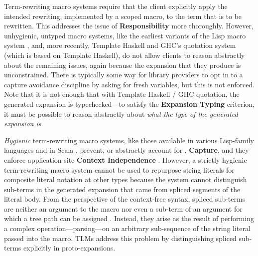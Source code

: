 \documentclass[acmsmall]{acmart}
\begin{document}
Term-rewriting macro systems require that the client explicitly apply the intended rewriting, implemented by a scoped macro, to the term that is to be rewritten. This addresses the issue of \textbf{Responsibility} more thoroughly. However, unhygienic, untyped macro systems, like the earliest variants of the Lisp macro system \cite{Hart63a}, and, more recently, Template Haskell \cite{SheardPeytonJones:Haskell-02} and GHC's quotation system \cite{mainland2007s} (which is based on Template Haskell), do not allow clients to reason abstractly about the remaining issues, again because the expansion that they produce is unconstrained. There is typically some way for library providers to opt in to a capture avoidance discipline by asking for fresh variables, but this is not enforced. Note that it is not enough that with Template Haskell / GHC quotation, the generated expansion is typechecked---to satisfy the \textbf{Expansion Typing} criterion, it must be possible to reason abstractly about \emph{what the type of the generated expansion is}. 


\emph{Hygienic} term-rewriting macro systems, like those available in various Lisp-family languages \cite{mccarthy1978history} and in Scala \cite{ScalaMacros2013}, prevent, or abstractly account for \cite{DBLP:conf/esop/HermanW08,Herman10:Theory}, \textbf{Capture}, and they enforce application-site \textbf{Context Independence} \cite{Kohlbecker86a,DBLP:conf/popl/Adams15,DBLP:conf/popl/ClingerR91,DBLP:journals/lisp/DybvigHB92}. However, a strictly hygienic term-rewriting macro system cannot be used to repurpose string literals for composite literal notation at other types because the system cannot distinguish  sub-terms in the generated expansion that came from spliced segments of the literal body. From the perspective of the context-free syntax, spliced sub-terms are neither an argument to the macro nor even a sub-term of an argument for which a tree path can be assigned \cite{DBLP:conf/esop/HermanW08,Herman10:Theory,gorn1965explicit}. Instead, they arise as the result of performing a complex operation---parsing---on an arbitrary sub-sequence of the string literal passed into the macro. TLMs address this problem by distinguishing spliced sub-terms explicitly in proto-expansions.
\end{document}
